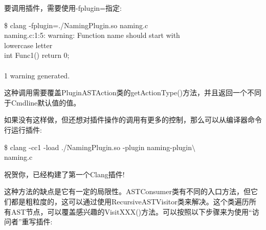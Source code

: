 要调用插件，需要使用-fplugin=指定:\par

\begin{tcolorbox}[colback=white,colframe=black]
\$ clang -fplugin=./NamingPlugin.so naming.c \\
naming.c:1:5: warning: Function name should start with \\
lowercase letter \\
int Func1() { return 0; } \\
\hspace*{0.7cm}\^ \\
1 warning generated.
\end{tcolorbox}

这种调用需要覆盖PluginASTAction类的getActionType()方法，并且返回一个不同于Cmdline默认值的值。\par

如果没有这样做，但还想对插件操作的调用有更多的控制，那么可以从编译器命令行运行插件:\par

\begin{tcolorbox}[colback=white,colframe=black]
\$ clang -cc1 -load ./NamingPlugin.so -plugin naming-plugin$\setminus$ \\
\hspace*{0.5cm}naming.c
\end{tcolorbox}

祝贺你，已经构建了第一个Clang插件!\par

这种方法的缺点是它有一定的局限性。ASTConsumer类有不同的入口方法，但它们都是粗粒度的，这可以通过使用RecursiveASTVisitor类来解决。这个类遍历所有AST节点，可以覆盖感兴趣的VisitXXX()方法。可以按照以下步骤来为使用“访问者”重写插件:\par

